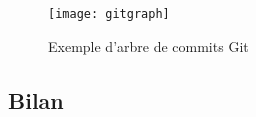 \begin{figure}[htb]
	\centering
	\texttt{[image: gitgraph]}
	\caption{Exemple d'arbre de commits Git}
	\label{fig:git}
\end{figure}
\subsection{Bilan}